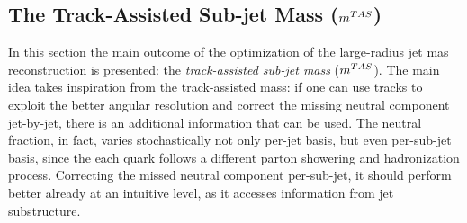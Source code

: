 




\subsection{The Track-Assisted Sub-jet Mass ($m^{TAS}$)}\label{subsec:mtas_def}
In this section the main outcome of the optimization of the large-radius jet mas reconstruction is presented: the \textit{track-assisted sub-jet mass} ($m^{TAS}$).
The main idea takes inspiration from the track-assisted mass: if one can use tracks to exploit the better angular resolution and correct the missing neutral component jet-by-jet, there is an additional information that can be used. The neutral fraction, in fact, varies stochastically not only per-jet basis, but even per-sub-jet basis, since the each quark follows a different parton showering and hadronization process.
Correcting the missed neutral component per-sub-jet, it should perform better already at an intuitive level, as it accesses information from jet substructure.
  
